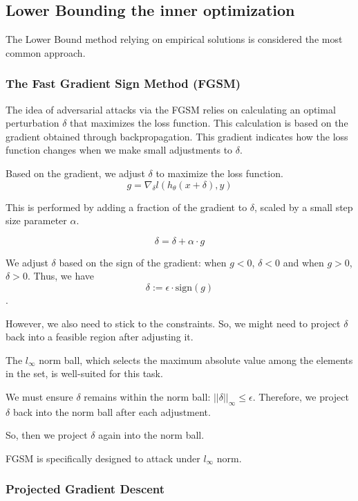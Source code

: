 \subsection{Lower Bounding the inner optimization}

The Lower Bound method relying on empirical solutions is considered the most common approach.

\subsubsection{The Fast Gradient Sign Method (FGSM)}

The idea of adversarial attacks via the FGSM relies on calculating an optimal perturbation 
$\delta$ that maximizes the loss function. This calculation is based on the gradient obtained through backpropagation. 
This gradient indicates how the loss function changes when we make small adjustments to $\delta$.

Based on the gradient, we adjust $\delta$ to maximize the loss function. 
\[g = \nabla_\delta l(h_\theta(x + \delta), y)\]

This is performed by adding a fraction of 
the gradient to $\delta$, scaled by a small step size parameter $\alpha$.

\[\delta = \delta +  \alpha \cdot g\]

We adjust $\delta$ based on the sign of the gradient: when $g<0$, $\delta < 0$ and when $g>0$, $\delta > 0$. 
Thus, we have \[\delta := \epsilon \cdot \text{sign}(g)\].

However, we also need to stick to the constraints. So, we might need to project $\delta$ back into a feasible region after adjusting it.

The  $l_{\infty}$ norm ball, which selects the maximum absolute value among the elements in the set, is well-suited for this task.

We must ensure $\delta$ remains within the norm ball: $||\delta||_\infty \leq \epsilon$. 
Therefore, we project $\delta$ back into the norm ball after each adjustment.


So, then we project $\delta$ again into the norm ball.  


FGSM is specifically designed to attack under $l_\infty$ norm. 


\subsubsection{Projected Gradient Descent}

